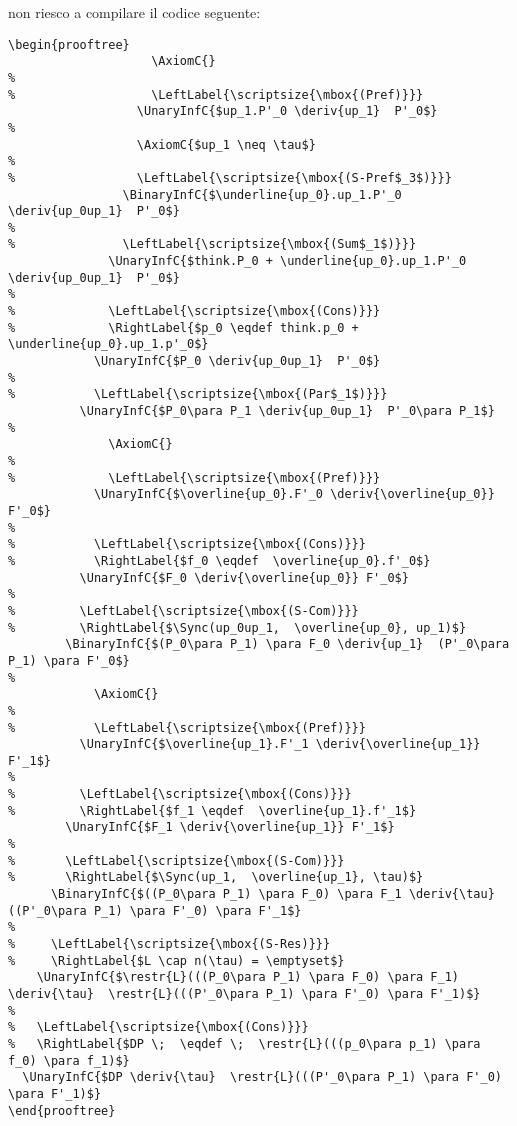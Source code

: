 \begin{example}
\begin{center}
	  non riesco a compilare il codice seguente:
\begin{verbatim}
\begin{prooftree}
                    \AxiomC{}
%
%                   \LeftLabel{\scriptsize{\mbox{(Pref)}}}
                  \UnaryInfC{$up_1.P'_0 \deriv{up_1}  P'_0$}
%
                  \AxiomC{$up_1 \neq \tau$}
%
%                 \LeftLabel{\scriptsize{\mbox{(S-Pref$_3$)}}}
                \BinaryInfC{$\underline{up_0}.up_1.P'_0 \deriv{up_0up_1}  P'_0$}
%
%               \LeftLabel{\scriptsize{\mbox{(Sum$_1$)}}}
              \UnaryInfC{$think.P_0 + \underline{up_0}.up_1.P'_0 \deriv{up_0up_1}  P'_0$}
%
%             \LeftLabel{\scriptsize{\mbox{(Cons)}}}
%             \RightLabel{$p_0 \eqdef think.p_0 + \underline{up_0}.up_1.p'_0$}
            \UnaryInfC{$P_0 \deriv{up_0up_1}  P'_0$}
%
%           \LeftLabel{\scriptsize{\mbox{(Par$_1$)}}}
          \UnaryInfC{$P_0\para P_1 \deriv{up_0up_1}  P'_0\para P_1$}
%
              \AxiomC{}
%
%             \LeftLabel{\scriptsize{\mbox{(Pref)}}}
            \UnaryInfC{$\overline{up_0}.F'_0 \deriv{\overline{up_0}} F'_0$}
%
%           \LeftLabel{\scriptsize{\mbox{(Cons)}}}
%           \RightLabel{$f_0 \eqdef  \overline{up_0}.f'_0$}
          \UnaryInfC{$F_0 \deriv{\overline{up_0}} F'_0$}
%
%         \LeftLabel{\scriptsize{\mbox{(S-Com)}}}
%         \RightLabel{$\Sync(up_0up_1,  \overline{up_0}, up_1)$}
        \BinaryInfC{$(P_0\para P_1) \para F_0 \deriv{up_1}  (P'_0\para P_1) \para F'_0$}
%
            \AxiomC{}
%
%           \LeftLabel{\scriptsize{\mbox{(Pref)}}}
          \UnaryInfC{$\overline{up_1}.F'_1 \deriv{\overline{up_1}} F'_1$}
%
%         \LeftLabel{\scriptsize{\mbox{(Cons)}}}
%         \RightLabel{$f_1 \eqdef  \overline{up_1}.f'_1$}
        \UnaryInfC{$F_1 \deriv{\overline{up_1}} F'_1$}
%
%       \LeftLabel{\scriptsize{\mbox{(S-Com)}}}
%       \RightLabel{$\Sync(up_1,  \overline{up_1}, \tau)$}
      \BinaryInfC{$((P_0\para P_1) \para F_0) \para F_1 \deriv{\tau}  ((P'_0\para P_1) \para F'_0) \para F'_1$}
%
%     \LeftLabel{\scriptsize{\mbox{(S-Res)}}}
%     \RightLabel{$L \cap n(\tau) = \emptyset$}
    \UnaryInfC{$\restr{L}(((P_0\para P_1) \para F_0) \para F_1) \deriv{\tau}  \restr{L}(((P'_0\para P_1) \para F'_0) \para F'_1)$}
%
%   \LeftLabel{\scriptsize{\mbox{(Cons)}}}
%   \RightLabel{$DP \;  \eqdef \;  \restr{L}(((p_0\para p_1) \para f_0) \para f_1)$}
  \UnaryInfC{$DP \deriv{\tau}  \restr{L}(((P'_0\para P_1) \para F'_0) \para F'_1)$}
\end{prooftree}
\end{verbatim}

	\fine
	\end{center}

      \end{example}


